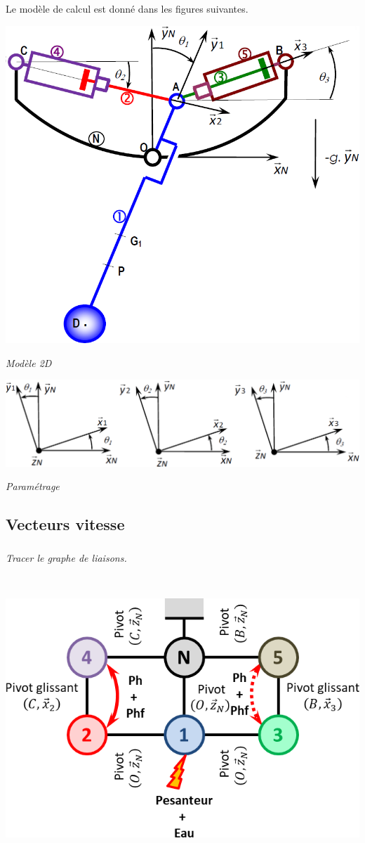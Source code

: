 \documentclass[10pt,fleqn]{article} %
\begin{document}
\begin{multicols}{2}
\begin{multicols}{2}
Le modèle de calcul est donné dans les figures suivantes.





\begin{center}
\includegraphics[width=.7\linewidth]{images/fig_05_a}

\textit{Modèle 2D}
\end{center}

\begin{center}
\includegraphics[width=\linewidth]{images/fig_05_b}

\textit{Paramétrage}
\end{center}

\fi


\subsection*{Vecteurs vitesse}

\subparagraph{}\textit{Tracer le graphe de liaisons.}
\ifprof
\begin{corrige} ~\\

\begin{center}
\includegraphics[width=.45\linewidth]{images/cor_01}
\end{center}
\end{corrige}
\else
\fi




\end{multicols}
\end{multicols}
\end{document}
